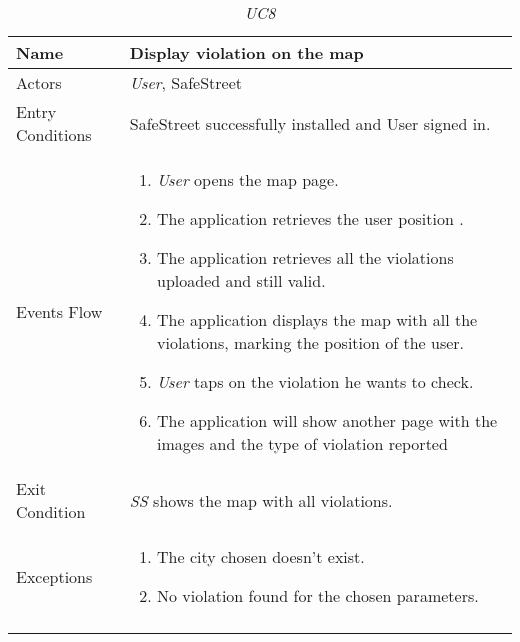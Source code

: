 \documentclass[../../../RASD.tex]{subfiles}
\begin{document}
    \begin{center}
        \begin{longtable}{| p{.35\linewidth} | p{.65\linewidth} |}
            \hline
            \textbf{Name} & \textbf{Display violation on the map}\\ \hline
            Actors & \textit{User}, SafeStreet\\ \hline
            Entry Conditions & SafeStreet successfully installed and User signed in.\\ \hline
            Events Flow &
            \begin{enumerate}
                \item \textit{User} opens the map page.
                \item  The application retrieves the user position .
                \item  The application retrieves all the violations uploaded and still valid.
                \item  The application displays the map with all the violations, marking the position of the user.
                \item \textit{User} taps on the violation he wants to check.
                \item The application will show another page with the images and the type of violation reported
            \end{enumerate}
            \\ \hline
            Exit Condition & \textit{SS} shows the map with all violations.\\ \hline
            Exceptions &
            \begin{enumerate}
                \item The city chosen doesn’t exist.
                \item No violation found for the chosen parameters.
            \end{enumerate}
            \\
            \hline
            \caption[\textit{Use Case 8}]{\textit{UC8}}
        \end{longtable}
    \end{center}
    \newpage
\end{document}
